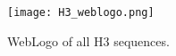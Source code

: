 \begin{figure}
  \centering
  \texttt{[image: H3\_weblogo.png]}
  \caption{WebLogo of all H3 sequences.}
  \label{fig:h3-weblogo}
\end{figure}

